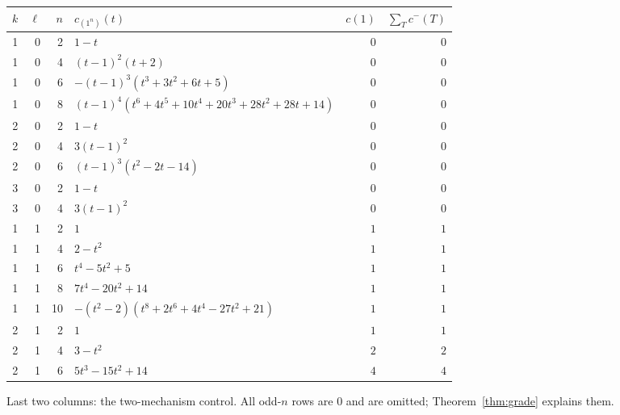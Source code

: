 \documentclass[11pt]{article}
\theoremstyle{plain}
\theoremstyle{definition}
\theoremstyle{remark}
\newcommand{\cm}{c^{-}}
\begin{document}
\begin{center}\small
\begin{tabular}{@{}rrr l r r@{}}
\toprule
$k$&$\ell$&$n$&$c_{(1^n)}(t)$&$c(1)$&$\sum_T\cm(T)$\\
\midrule
1&0&2&$1-t$&$0$&$0$\\
1&0&4&$(t-1)^2(t+2)$&$0$&$0$\\
1&0&6&$-(t-1)^3(t^3+3t^2+6t+5)$&$0$&$0$\\
1&0&8&$(t-1)^4(t^6+4t^5+10t^4+20t^3+28t^2+28t+14)$&$0$&$0$\\
2&0&2&$1-t$&$0$&$0$\\
2&0&4&$3(t-1)^2$&$0$&$0$\\
2&0&6&$(t-1)^3(t^2-2t-14)$&$0$&$0$\\
3&0&2&$1-t$&$0$&$0$\\
3&0&4&$3(t-1)^2$&$0$&$0$\\
1&1&2&$1$&$1$&$1$\\
1&1&4&$2-t^2$&$1$&$1$\\
1&1&6&$t^4-5t^2+5$&$1$&$1$\\
1&1&8&$7t^4-20t^2+14$&$1$&$1$\\
1&1&10&$-(t^2-2)(t^8+2t^6+4t^4-27t^2+21)$&$1$&$1$\\
2&1&2&$1$&$1$&$1$\\
2&1&4&$3-t^2$&$2$&$2$\\
2&1&6&$5t^3-15t^2+14$&$4$&$4$\\
\bottomrule
\end{tabular}
\end{center}
\noindent Last two columns: the two-mechanism control. All odd-$n$ rows are $0$ and are omitted;
Theorem~\ref{thm:grade} explains them.
\end{document}

